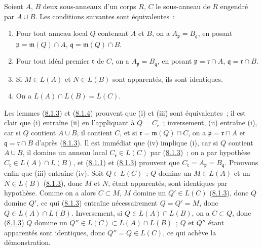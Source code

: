 \begin{proposition}[8.1.5]
\label{I.8.1.5-fr}
Soient $A$, $B$ deux sous-anneaux d'un corps $R$, $C$ le sous-anneau de $R$
engendré par $A\cup B$. Les conditions suivantes sont équivalentes~:
\begin{enumerate}
  \item[\textup{(i)}] Pour tout anneau local $Q$ contenant $A$ et $B$, on a
    $A_\mathfrak p=B_\mathfrak q$, en posant
    $\mathfrak p=\mathfrak m(Q)\cap A$,
    $\mathfrak q=\mathfrak m(Q)\cap B$.
  \item[\textup{(ii)}] Pour tout idéal premier $\mathfrak r$ de $C$, on a
    $A_\mathfrak p=B_\mathfrak q$, en posant
    $\mathfrak p=\mathfrak r\cap A$, $\mathfrak q=\mathfrak r\cap B$.
  \item[\textup{(iii)}] Si $M\in L(A)$ et $N\in L(B)$ sont apparentés, ils sont
    identiques.
  \item[\textup{(iv)}] On a $L(A)\cap L(B)=L(C)$.
\end{enumerate}
\end{proposition}

Les lemmes (\hyperref[I.8.1.3-fr]{8.1.3}) et
(\hyperref[I.8.1.4-fr]{8.1.4}) prouvent que (i) et (iii) sont équivalentes~;
il est clair que (i) entraîne (ii) en l'appliquant à $Q=C_\mathfrak r$~;
inversement, (ii) entraîne (i), car si $Q$ contient $A\cup B$, il contient
$C$, et si $\mathfrak r=\mathfrak m(Q)\cap C$, on a
$\mathfrak p=\mathfrak r\cap A$ et $\mathfrak q=\mathfrak r\cap B$ d'après
(\hyperref[I.8.1.3-fr]{8.1.3}). Il est immédiat que (iv) implique (i), car si
$Q$ contient $A\cup B$, il domine un anneau local
$C_\mathfrak r\in L(C)$ par (\hyperref[I.8.1.3-fr]{8.1.3})~; on a par
hypothèse $C_\mathfrak r\in L(A)\cap L(B)$, et
(\hyperref[I.8.1.1-fr]{8.1.1}) et (\hyperref[I.8.1.3-fr]{8.1.3}) prouvent que
$C_\mathfrak r=A_\mathfrak p=B_\mathfrak q$. Prouvons enfin que (iii)
entraîne (iv). Soit $Q\in L(C)$~; $Q$ domine un $M\in L(A)$ et un
$N\in L(B)$ (\hyperref[I.8.1.3-fr]{8.1.3}), donc $M$ et $N$, étant
apparentés, sont identiques par hypothèse. Comme on a alors $C\subset M$,
$M$ domine un $Q'\in L(C)$ (\hyperref[I.8.1.3-fr]{8.1.3}), donc $Q$ domine
$Q'$, ce qui (\hyperref[I.8.1.3-fr]{8.1.3}) entraîne nécessairement
$Q=Q'=M$, donc $Q\in L(A)\cap L(B)$. Inversement, si
$Q\in L(A)\cap L(B)$, on a $C\subset Q$, donc
(\hyperref[I.8.1.3-fr]{8.1.3}) $Q$ domine un
$Q''\in L(C)\subset L(A)\cap L(B)$~; $Q$ et $Q''$ étant apparentés sont
identiques, donc $Q''=Q\in L(C)$, ce qui achève la démonstration.

